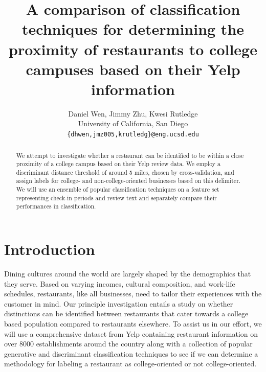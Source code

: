 \documentclass[10pt,twocolumn,letterpaper]{article}
\begin{document}
\title{A comparison of classification techniques for determining the proximity
of restaurants to college campuses based on their Yelp information}

\author{Daniel Wen, Jimmy Zhu, Kwesi Rutledge\\
  University of California, San Diego\\
  {\tt\small \{dhwen,jmz005,krutledg\}@eng.ucsd.edu}
}

\maketitle

\begin{abstract}
  We attempt to investigate whether a restaurant can be identified to be within
  a close proximity of a college campus based on their Yelp review data. We
  employ a discriminant distance threshold of around 5 miles, chosen by
  cross-validation, and assign labels for college- and non-college-oriented
  businesses based on this delimiter. We will use an ensemble of popular
  classification techniques on a feature set representing check-in periods and
  review text and separately compare their performances in classification.
\end{abstract}

\section{Introduction}

Dining cultures around the world are largely shaped by the demographics that
they serve. Based on varying incomes, cultural composition, and work-life
schedules, restaurants, like all businesses, need to tailor their experiences
with the customer in mind. Our principle investigation entails a study on
whether distinctions can be identified between restaurants that cater towards a
college based population compared to restaurants elsewhere. To assist us in our
effort, we will use a comprehensive dataset from Yelp containing restaurant
information on over 8000 establishments around the country along with a
collection of popular generative and discriminant classification techniques to
see if we can determine a methodology for labeling a restaurant as
college-oriented or not college-oriented.
\end{document}
